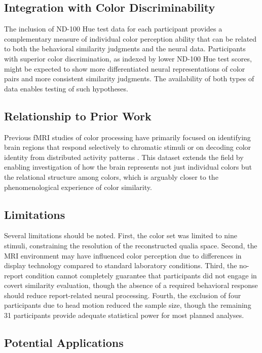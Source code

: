 \documentclass[11pt]{article}
\begin{document}
\subsection{Integration with Color Discriminability}

The inclusion of ND-100 Hue test data for each participant provides a complementary measure of individual color perception ability that can be related to both the behavioral similarity judgments and the neural data. Participants with superior color discrimination, as indexed by lower ND-100 Hue test scores, might be expected to show more differentiated neural representations of color pairs and more consistent similarity judgments. The availability of both types of data enables testing of such hypotheses.

\subsection{Relationship to Prior Work}

Previous fMRI studies of color processing have primarily focused on identifying brain regions that respond selectively to chromatic stimuli \citep{zeki1980representation, wade2002visual} or on decoding color identity from distributed activity patterns \citep{brouwer2009decoding}. This dataset extends the field by enabling investigation of how the brain represents not just individual colors but the relational structure among colors, which is arguably closer to the phenomenological experience of color similarity.

\subsection{Limitations}

Several limitations should be noted. First, the color set was limited to nine stimuli, constraining the resolution of the reconstructed qualia space. Second, the MRI environment may have influenced color perception due to differences in display technology compared to standard laboratory conditions. Third, the no-report condition cannot completely guarantee that participants did not engage in covert similarity evaluation, though the absence of a required behavioral response should reduce report-related neural processing. Fourth, the exclusion of four participants due to head motion reduced the sample size, though the remaining 31 participants provide adequate statistical power for most planned analyses.

\subsection{Potential Applications}
\end{document}
